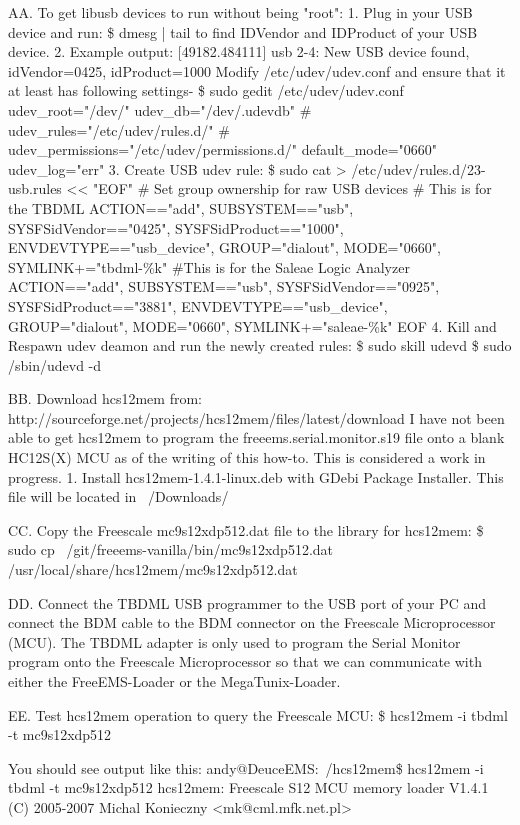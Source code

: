 \documentclass[12pt,notitlepage,onecolumn,oneside,openany,draft]{memoir}
\begin{document}
AA. To get libusb devices to run without being "root":
1. Plug in your USB device and run:
\$ dmesg | tail
to find IDVendor and IDProduct of your USB device.
2. Example output:
[49182.484111] usb 2-4: New USB device found, idVendor=0425, idProduct=1000
Modify /etc/udev/udev.conf and ensure that it at least has following settings-
\$ sudo gedit /etc/udev/udev.conf		
udev_root="/dev/"
udev_db="/dev/.udevdb"
# udev_rules="/etc/udev/rules.d/"
# udev_permissions="/etc/udev/permissions.d/"
default_mode="0660"
udev_log="err"
3. Create USB udev rule:
\$ sudo cat > /etc/udev/rules.d/23-usb.rules << "EOF"
# Set group ownership for raw USB devices
# This is for the TBDML
ACTION=="add", SUBSYSTEM=="usb", SYSFS{idVendor}=="0425", SYSFS{idProduct}=="1000", ENV{DEVTYPE}=="usb_device", GROUP="dialout", MODE="0660", SYMLINK+="tbdml-\%k"
#This is for the Saleae Logic Analyzer 
ACTION=="add", SUBSYSTEM=="usb", SYSFS{idVendor}=="0925", SYSFS{idProduct}=="3881", ENV{DEVTYPE}=="usb_device", GROUP="dialout", MODE="0660", SYMLINK+="saleae-\%k"
EOF
4. Kill and Respawn udev deamon and run the newly created rules:
\$ sudo skill udevd
\$ sudo /sbin/udevd -d

BB. Download hcs12mem from:
	http://sourceforge.net/projects/hcs12mem/files/latest/download
	I have not been able to get hcs12mem to program the freeems.serial.monitor.s19 file onto a blank 	HC12S(X) MCU as of the writing of this how-to.  This is considered a work in progress.
1. Install hcs12mem-1.4.1-linux.deb with GDebi Package Installer. This file will be located in ~/Downloads/

CC. Copy the Freescale mc9s12xdp512.dat file to the library for hcs12mem:
	\$ sudo cp ~/git/freeems-vanilla/bin/mc9s12xdp512.dat /usr/local/share/hcs12mem/mc9s12xdp512.dat

DD. Connect the TBDML USB programmer to the USB port of your PC and connect the BDM cable to the BDM connector on the Freescale Microprocessor (MCU).  The TBDML adapter is only used to program the Serial Monitor program onto the Freescale Microprocessor so that we can communicate with either the FreeEMS-Loader or the MegaTunix-Loader.

EE. Test hcs12mem operation to query the Freescale MCU:
	\$ hcs12mem -i tbdml -t mc9s12xdp512

	You should see output like this:
	andy@DeuceEMS:~/hcs12mem\$ hcs12mem -i tbdml -t mc9s12xdp512
	hcs12mem: Freescale S12 MCU memory loader V1.4.1 (C) 2005-2007 Michal Konieczny 	<mk@cml.mfk.net.pl>
\end{document}
